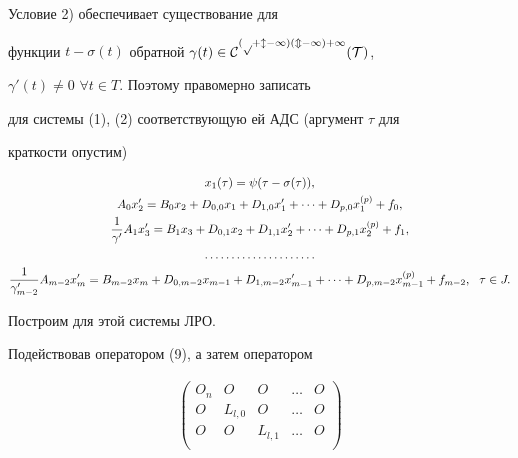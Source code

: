 \begin{pf}


Условие 2) обеспечивает существование для


функции $t-\sigma(t)$ обратной $\gamma(t) \in \cal C^{(p+l-1)(m-1)+1}(T)$,


$\gamma'(t) \neq 0$ $\forall t \in T$. Поэтому правомерно записать


для системы (1), (2) соответствующую ей АДС (аргумент $\tau$ для 


краткости опустим)


\begin{gather}


x_1(\tau)=\psi (\tau-\sigma(\tau)),\notag \\


% 


A_0x'_2=B_0x_2+D_{0,0}x_1+D_{1,0}x'_1+\dotsb+D_{p,0}x^{(p)}_1+f_0,\notag\\


%


\frac{1}{\gamma'}A_1x'_3=B_1x_3+D_{0,1}x_2+D_{1,1}x'_2+ \dotsb


+D_{p,1}x^{(p)}_2+f_1, \\


%


\dotsc\dotsc\dotsc\dotsc\dotsc\dotsc\dotsc \notag \\


%


\frac{1}{\gamma'_{m-2}}A_{m-2}x'_m=B_{m-2}x_m+D_{0,m-2}x_{m-1}+


D_{1,m-2}x'_{m-1}+ \dotsb +D_{p,m-2}x^{(p)}_{m-1}+f_{m-2},


\ \ \tau\in J.\notag


\end{gather}





Построим для этой системы ЛРО.


Подействовав оператором (9), а затем оператором


\begin{multline}


\begin{pmatrix}


O_n & O & O & \dotsc & O\\


O & L_{l,0} & O & \dotsc & O\\


O & O & L_{l,1} & \dotsc & O\\



\end{pmatrix}
\end{multline}
\end{pf}
